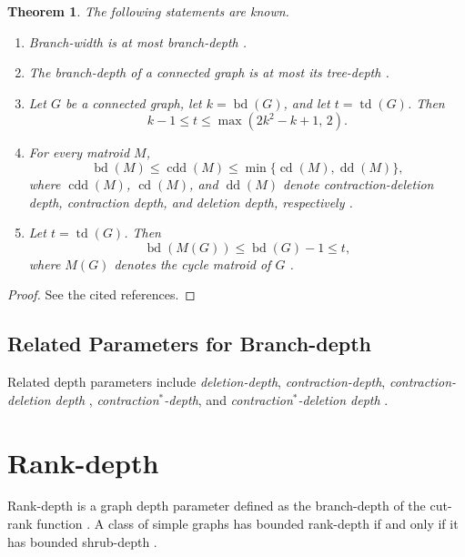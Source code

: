 \documentclass[10pt]{book}
\newtheorem{theorem}{Theorem}[section]
\theoremstyle{definition}
\begin{document}
\begin{theorem}
The following statements are known.
\begin{enumerate}
    \item Branch-width is at most branch-depth \cite{91}.

    \item The branch-depth of a connected graph is at most its tree-depth \cite{91}.

    \item Let \(G\) be a connected graph, let \(k=\operatorname{bd}(G)\), and let \(t=\operatorname{td}(G)\). Then
    \[
    k-1 \leq t \leq \max(2k^2-k+1,\,2).
    \]
    \cite{91}

    \item For every matroid \(M\),
    \[
    \operatorname{bd}(M)\leq \operatorname{cdd}(M)
    \leq \min\{\operatorname{cd}(M),\operatorname{dd}(M)\},
    \]
    where \(\operatorname{cdd}(M)\), \(\operatorname{cd}(M)\), and \(\operatorname{dd}(M)\) denote contraction-deletion depth, contraction depth, and deletion depth, respectively \cite{91}.

    \item Let \(t=\operatorname{td}(G)\). Then
    \[
    \operatorname{bd}(M(G)) \leq \operatorname{bd}(G)-1 \leq t,
    \]
    where \(M(G)\) denotes the cycle matroid of \(G\) \cite{91}.
\end{enumerate}
\end{theorem}

\begin{proof}
See the cited references.
\end{proof}

\subsection{Related Parameters for Branch-depth}

Related depth parameters include \emph{deletion-depth}, \emph{contraction-depth}, \emph{contraction-deletion depth} \cite{91}, \emph{contraction\(^*\)-depth}, and \emph{contraction\(^*\)-deletion depth} \cite{178}.

\section{Rank-depth}

Rank-depth is a graph depth parameter defined as the branch-depth of the cut-rank function \cite{91}.  
A class of simple graphs has bounded rank-depth if and only if it has bounded shrub-depth \cite{91}.
\end{document}

